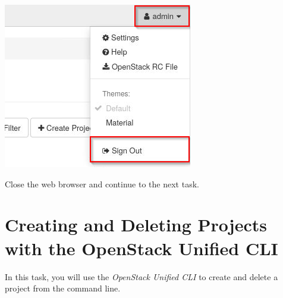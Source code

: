 \documentclass[letterpaper, 12pt]{article}
\begin{document}
\begin{enumerate}
\begin{labstep}
        \begin{center}
            \includegraphics[scale=0.65]{images/part1/step9.png}
        \end{center}
    \end{labstep}

    \begin{labstep}
        Close the web browser and continue to the next task.
    \end{labstep}
\end{enumerate}

\section{Creating and Deleting Projects with the OpenStack Unified CLI}\label{sec:creating-and-deleting-projects-with-the-openstack-unified-cli}
In this task, you will use the \textit{OpenStack Unified CLI} to create and delete a project from the command line.
\end{document}

